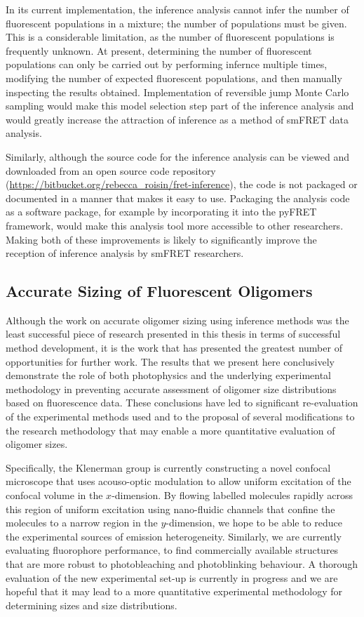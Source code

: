 In its current implementation, the inference analysis cannot infer the number of fluorescent populations in a mixture; the number of populations must be given. This is a considerable limitation, as the number of fluorescent populations is frequently unknown. At present, determining the number of fluorescent populations can only be carried out by performing infernce multiple times, modifying the number of expected fluorescent populations, and then manually inspecting the results obtained. Implementation of reversible jump Monte Carlo sampling would make this model selection step part of the inference analysis and would greatly increase the attraction of inference as a method of smFRET data analysis. 

Similarly, although the source code for the inference analysis can be viewed and downloaded from an open source code repository (\url{https://bitbucket.org/rebecca_roisin/fret-inference}), the code is not packaged or documented in a manner that makes it easy to use. Packaging the analysis code as a software package, for example by incorporating it into the pyFRET framework, would make this analysis tool more accessible to other researchers. Making both of these improvements is likely to significantly improve the reception of inference analysis by smFRET researchers.

\subsection{Accurate Sizing of Fluorescent Oligomers}
Although the work on accurate oligomer sizing using inference methods was the least successful piece of research presented in this thesis in terms of successful method development, it is the work that has presented the greatest number of opportunities for further work. The results that we present here conclusively demonstrate the role of both photophysics and the underlying experimental methodology in preventing accurate assessment of oligomer size distributions based on fluorescence data. These conclusions have led to significant re-evaluation of the experimental methods used and to the proposal of several modifications to the research methodology that may enable a more quantitative evaluation of oligomer sizes.

Specifically, the Klenerman group is currently constructing a novel confocal microscope that uses acouso-optic modulation to allow uniform excitation of the confocal volume in the $x$-dimension. By flowing labelled molecules rapidly across this region of uniform excitation using nano-fluidic channels that confine the molecules to a narrow region in the $y$-dimension, we hope to be able to reduce the experimental sources of emission heterogeneity. Similarly, we are currently evaluating fluorophore performance, to find commercially available structures that are more robust to photobleaching and photoblinking behaviour. A thorough evaluation of the new experimental set-up is currently in progress and we are hopeful that it may lead to a more quantitative experimental methodology for determining sizes and size distributions.

